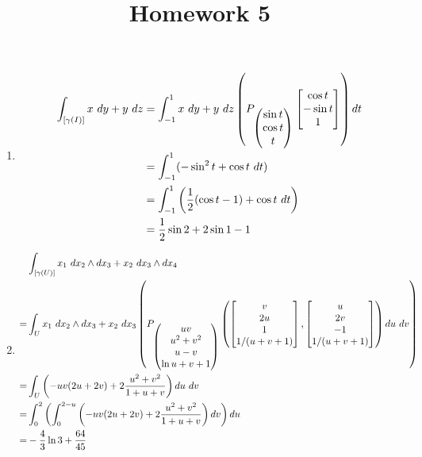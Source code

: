 \documentclass{homework}
\title{Homework 5}
\begin{document}
\maketitle

\begin{problem}{1}
  \begin{enumerate}
    \item
    \begin{align*}
      \int_{[\gamma(I)]} x\ dy+y\ dz &=
      \int_{-1}^{1} x\ dy+y\ dz
        \left(
          P_{\begin{pmatrix}\sin t \\  \cos t \\ t\end{pmatrix}}
             \begin{bmatrix}\cos t \\ -\sin t \\ 1\end{bmatrix}
        \right) dt \\ &=
      \int_{-1}^{1} (-\sin^2 t + \cos t\ dt) \\ &=
      \int_{-1}^{1}
        \left(
        \dfrac{1}{2}(\cos t - 1) + \cos t\ dt
        \right)
        \\ &=
      \dfrac{1}{2} \sin 2 + 2 \sin 1 - 1
    \end{align*}
    \item
    \begin{align*} &
      \int_{[\gamma(U)]} x_1\ dx_2 \land dx_3 + x_2\ dx_3 \land dx_4 \\ =&
      \int_U x_1\ dx_2 \land dx_3 + x_2\ dx_3
        \left(
        P_{\begin{pmatrix}uv \\ u^2+v^2 \\ u-v \\ \ln{u+v+1}\end{pmatrix}}
          \left(
            \begin{bmatrix}v \\ 2u \\ 1  \\ 1/(u+v+1)\end{bmatrix},
            \begin{bmatrix}u \\ 2v \\ -1 \\ 1/(u+v+1)\end{bmatrix}
          \right) du\ dv
        \right)
        \\ =&
      \int_U \left( -uv(2u+2v) + 2\dfrac{u^2+v^2}{1+u+v} \right) du\ dv \\ =&
      \int_0^2
        \left( \int_0^{2-u}
          \left( -uv(2u+2v) + 2\dfrac{u^2+v^2}{1+u+v} \right)
        dv \right)
        du
        \\ =&
      -\dfrac{4}{3} \ln 3 + \dfrac{64}{45}
    \end{align*}
  \end{enumerate}
\end{problem}
\end{document}
